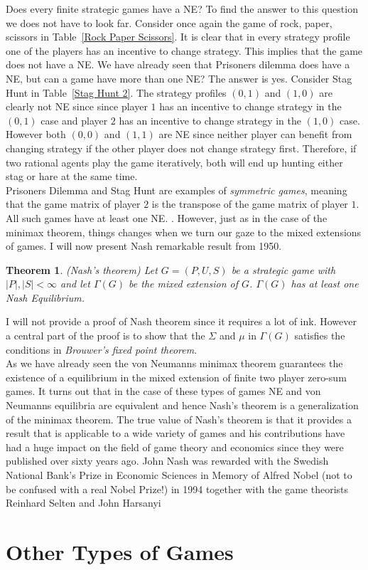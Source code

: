 \documentclass{article}
\newtheorem{theorem}{Theorem}[section]
\theoremstyle{definition}
\theoremstyle{remark}
\begin{document}
Does every finite strategic games have a NE? To find the answer to
this question we
does not have to look far. Consider once again the game of rock,
paper, scissors in Table~\ref{Rock Paper Scissors}. It is clear that
in every strategy profile one of the players has an incentive to
change strategy. This implies that the game does not have a NE. We
have already seen that Prisoners dilemma does have a NE, but can a
game have more than one NE? The answer is yes. Consider Stag Hunt in
Table~\ref{Stag Hunt 2}. The strategy profiles $(0,1)$ and $(1,0)$ are
clearly not NE since since player $1$ has an incentive to change
strategy in the $(0,1)$ case and player $2$ has an incentive to change
strategy in the $(1,0)$ case. However both $(0,0)$ and $(1,1)$ are NE
since neither player can benefit from changing strategy if the other
player does not change strategy first. Therefore, if two rational
agents play the game iteratively, both will end up hunting either stag
or hare at the same time.\\

Prisoners Dilemma and Stag Hunt are examples of \emph{symmetric
  games}, meaning that the game matrix of player $2$ is the transpose of
the game matrix of player $1$. All such games have at least one
NE. \citep{cheng2004notes}. However, just as in the case of the
minimax theorem, things changes when we turn our gaze to the mixed
extensions of games. I will now present Nash remarkable result from 1950.

\begin{theorem}(Nash's theorem)
  Let $G = (P,U,S)$ be a strategic game with $|P|,|S| < \infty$ and
  let $\Gamma(G)$ be the mixed extension of $G$. $\Gamma(G)$ has at
  least one Nash Equilibrium. \citep{Maschler}
  \end{theorem}

  I will not provide a proof of Nash theorem since it requires a lot
  of ink. However a central part of the proof is to show that the
  $\Sigma$ and $\mu$ in $\Gamma(G)$ satisfies the conditions in
  \emph{Brouwer's fixed point theorem}.\\

  As we have already seen the von Neumanns minimax theorem guarantees
  the existence of a equilibrium in the mixed extension of finite two
  player zero-sum games. It turns out that in the case of these types
  of games NE and von Neumanns equilibria are equivalent and hence
  Nash's theorem is a generalization of the minimax theorem. The true
  value of Nash's theorem is that it provides a result that is
  applicable to a wide variety of games and his contributions have had
  a huge impact on the field of game theory and economics since they
  were published over sixty years ago. John Nash was rewarded with the
  Swedish National Bank's Prize in Economic Sciences in Memory of
  Alfred Nobel (not to be confused with a real Nobel Prize!) in 1994
  together with the game theorists Reinhard Selten and John Harsanyi

  
\section{Other Types of Games}

\newpage

\printbibliography
\end{document}
